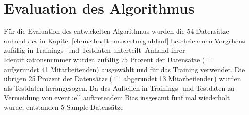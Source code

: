 

\section{Evaluation des Algorithmus}
Für die Evaluation des entwickelten Algorithmus wurden die 54 Datensätze anhand des in Kapitel \ref{ch:methodik:auswertung:ablauf} beschriebenen Vorgehens zufällig in Trainings- und Testdaten unterteilt.
Anhand ihrer Identifikationsnummer wurden zufällig 75 Prozent der Datensätze ($\hat{=}$ aufgerundet 41 Mitarbeitenden) ausgewählt und für das Training verwendet.
Die übrigen 25 Prozent der Datensätze ($\hat{=}$ abgerundet 13 Mitarbeitenden) wurden als Testdaten herangezogen.
Da das Aufteilen in Trainings- und Testdaten zu Vermeidung von eventuell auftretendem Bias insgesamt fünf mal wiederholt wurde, entstanden 5 Sample-Datensätze.


